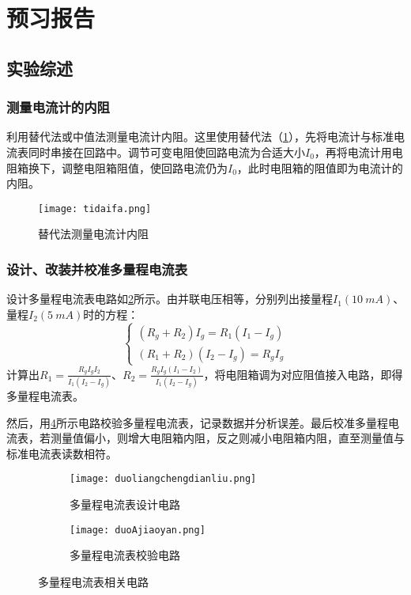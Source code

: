 \documentclass[]{../template/Report}
\begin{document}
\makecover

\section{预习报告}
\subsection{实验综述}
\subsubsection{测量电流计的内阻}
    利用替代法或中值法测量电流计内阻。这里使用替代法（\cref{tidaifa}），先将电流计与标准电流表同时串接在回路中。调节可变电阻使回路电流为合适大小$I_0$，再将电流计用电阻箱换下，调整电阻箱阻值，使回路电流仍为$I_0$，此时电阻箱的阻值即为电流计的内阻。
    \begin{figure}[htbp]
        \centering
        \texttt{[image: tidaifa.png]}
        \caption{替代法测量电流计内阻}
        \label{tidaifa}
    \end{figure}

\subsubsection{设计、改装并校准多量程电流表}
    设计多量程电流表电路如\cref{duoliangchengdianliu}所示。由并联电压相等，分别列出接量程$I_1(\SI{10}{mA})$、量程$I_2(\SI{5}{mA})$时的方程：
    \begin{equation}
        \begin{cases}
            (R_g+R_2)I_g = R_1 (I_1 - I_g)\\
            (R_1+R_2)(I_2 - I_g) = R_g I_g
        \end{cases}
    \end{equation}
    计算出$R_1 = \frac{R_gI_gI_2}{I_1(I_2-I_g)}$、$R_2 = \frac{R_gI_g(I_1-I_2)}{I_1(I_2-I_g)}$，将电阻箱调为对应阻值接入电路，即得多量程电流表。

    然后，用\cref{duoAjiaoyan}所示电路校验多量程电流表，记录数据并分析误差。最后校准多量程电流表，若测量值偏小，则增大电阻箱内阻，反之则减小电阻箱内阻，直至测量值与标准电流表读数相符。
    \begin{figure}[htbp]
        \centering
        \begin{subfigure}[b]{0.45\textwidth}
            \texttt{[image: duoliangchengdianliu.png]}
            \caption{多量程电流表设计电路}
            \label{duoliangchengdianliu}
        \end{subfigure}
        \hfill
        \begin{subfigure}[b]{0.45\textwidth}
            \texttt{[image: duoAjiaoyan.png]}
            \caption{多量程电流表校验电路}
            \label{duoAjiaoyan}
        \end{subfigure}
    \caption{多量程电流表相关电路}
    \end{figure}
\end{document}
